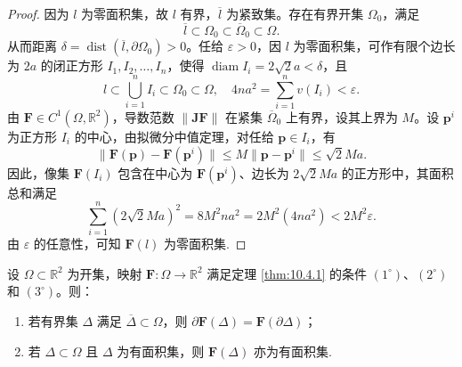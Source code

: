 \begin{proof}
因为 $l$ 为零面积集，故 $l$ 有界，$\overline{l}$ 为紧致集。存在有界开集 $\Omega_0$，满足
\[
\overline{l} \subset \Omega_0 \subset \overline{\Omega}_0 \subset \Omega.
\]
从而距离 $\delta = \operatorname{dist}(\overline{l}, \partial\Omega_0) > 0$。任给 $\varepsilon > 0$，因 $l$ 为零面积集，可作有限个边长为 $2a$ 的闭正方形 $I_1, I_2, \dots, I_n$，使得 $\operatorname{diam} I_i = 2\sqrt{2}a < \delta$，且
\[
l \subset \bigcup_{i=1}^n I_i \subset \Omega_0 \subset \Omega,\quad 4n a^2 = \sum_{i=1}^n v(I_i) < \varepsilon.
\]
由 $\boldsymbol{F} \in C^1(\Omega, \mathbb{R}^2)$，导数范数 $\|\boldsymbol{J}\boldsymbol{F}\|$ 在紧集 $\overline{\Omega}_0$ 上有界，设其上界为 $M$。设 $\boldsymbol{p}^i$ 为正方形 $I_i$ 的中心，由拟微分中值定理，对任给 $\boldsymbol{p} \in I_i$，有
\[
\|\boldsymbol{F}(\boldsymbol{p}) - \boldsymbol{F}(\boldsymbol{p}^i)\| \leqslant M \|\boldsymbol{p} - \boldsymbol{p}^i\| \leqslant \sqrt{2} M a.
\]
因此，像集 $\boldsymbol{F}(I_i)$ 包含在中心为 $\boldsymbol{F}(\boldsymbol{p}^i)$、边长为 $2\sqrt{2} M a$ 的正方形中，其面积总和满足
\[
\sum_{i=1}^n (2\sqrt{2} M a)^2 = 8 M^2 n a^2 = 2 M^2 (4 n a^2) < 2 M^2 \varepsilon.
\]
由 $\varepsilon$ 的任意性，可知 $\boldsymbol{F}(l)$ 为零面积集.
\end{proof}

\begin{lemma}\label{lem:10.4.2}
设 $\Omega \subset \mathbb{R}^2$ 为开集，映射 $\boldsymbol{F}\colon \Omega \to \mathbb{R}^2$ 满足定理 \ref{thm:10.4.1} 的条件 $(1^\circ)$、$(2^\circ)$ 和 $(3^\circ)$。则：
\begin{enumerate}
  \item 若有界集 $\Delta$ 满足 $\overline{\Delta} \subset \Omega$，则 $\partial\boldsymbol{F}(\Delta) = \boldsymbol{F}(\partial\Delta)$；
  \item 若 $\Delta \subset \Omega$ 且 $\Delta$ 为有面积集，则 $\boldsymbol{F}(\Delta)$ 亦为有面积集.
\end{enumerate}
\end{lemma}

